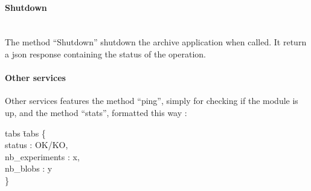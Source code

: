 \paragraph{Shutdown} \hspace{0pt} \\
The method ``Shutdown'' shutdown the archive application when called. It return a json response containing the status of the operation.

\paragraph{Other services}
Other services features the method ``ping'', simply for checking if the module is up, and the method ``stats'', formatted this way :
\begin{tabbing}
tabs \= tabs \kill
\{ \\
\> status : OK/KO, \\
\> nb\_experiments : x, \\
\> nb\_blobs : y \\
\} \\
\end{tabbing}
